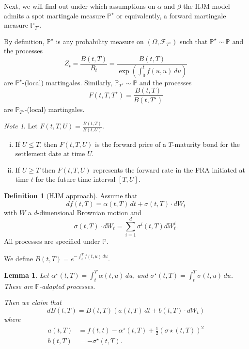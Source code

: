 \documentclass[10pt, oneside, reqno]{amsbook}
\theoremstyle{plain}%
\newtheorem{lem}[thm]{Lemma}
\theoremstyle{definition}
\newtheorem{defn}[thm]{Definition}
\theoremstyle{remark}
\newtheorem*{note}{Note}
\newcommand{\sigf}{\mathcal{F}}
\renewcommand{\P}{\mathbb{P}}
\newcommand{\F}{\mathbb{F}}
\numberwithin{equation}{chapter}
\begin{document}
Next, we will find out under which assumptions on $\alpha$ and $\beta$ the HJM model admits a spot martingale measure $\P^\star$ or equivalently, a forward martingale measure $\P_{T^\star}$.  

By definition, $\P^\star$ is any probability measure on $(\Omega, \sigf_{T^\star})$ such that $\P^\star \sim \P$ and the processes \[
    Z_t = \frac{B(t, T)}{B_t} = \frac{B(t, T)}{\exp\left(\int_0^t f(u, u) \, du \right)}
\] are $\P^\star$-(local) martingales.  Similarly, $\P_{T^\star} \sim \P$ and the processes \[
    F(t, T, T^\star) = \frac{B(t, T)}{B(t, T^\star)} 
\] are $\P_{T^\star}$-(local) martingales.

\begin{note}
    Let $F(t, T, U) = \frac{B(t, T)}{B(t, U)}$.
    
    \begin{enumerate}[(i)]
        \item If $U \leq T$, then $F(t, T, U)$ is the forward price of a $T$-maturity bond for the settlement date at time $U$.
        \item If $U \geq T$ then $F(t, T, U)$ represents the forward rate in the FRA initiated at time $t$ for the future time interval $[T,U]$. 
    \end{enumerate}  
\end{note}
    
\begin{defn}[HJM approach]
    Assume that \[
        df(t, T) = \alpha(t, T) \, dt + \sigma(t, T) \cdot dW_t
    \] with $W$ a $d$-dimensional Brownian motion and \[
        \sigma(t, T) \cdot dW_t = \sum_{i=1}^d \sigma^{i}(t, T) dW_t^{i}. 
    \]  All processes are specified under $\P$.  
    
    We define $B(t, T) = e^{-\int_t^T f(t, u) \, du}$.  
\end{defn}


\begin{lem}
    Let $\alpha^\star(t, T) = \int_t^T \alpha(t, u) \, du$, and $\sigma^\star(t, T) = \int_t^T \sigma(t, u) \, du$.  These are $\F$-adapted processes.
    
    Then we claim that \[
        dB(t, T) = B(t, T) \left( a(t, T) \, dt + b(t, T) \cdot dW_t \right)
    \] where \begin{align*}
        a(t, T) &= f(t, t) - \alpha^\star(t, T) + \frac{1}{2} \left(\sigma\star(t, T)\right)^2 \\
        b(t, T) &= - \sigma^\star(t, T).
    \end{align*}
\end{lem}
\end{document}
